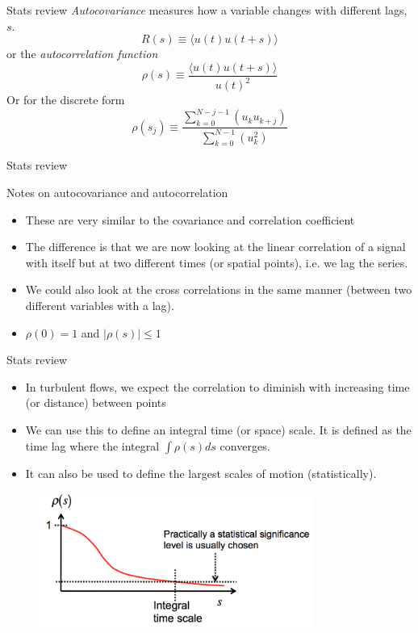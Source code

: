 \begin{frame}{Stats review}
\textit{Autocovariance} measures how a variable changes with different lags, $s$.
  $$R(s) \equiv \langle u(t) u(t+s)\rangle$$
  or the \textit{autocorrelation function}
  $$\rho(s) \equiv \frac{ \langle u(t)u(t+s)\rangle}{u(t)^2}$$
  Or for the discrete form
  $$\rho(s_j) \equiv \frac{ \sum^{N-j-1}_{k=0}(u_ku_{k+j})}{\sum^{N-1}_{k=0}(u_k^2)}$$
\end{frame}


\begin{frame}{Stats review}
  
  Notes on autocovariance and autocorrelation
  \begin{itemize}
  	\item These are very similar to the covariance and correlation coefficient
  	\item The difference is that we are now looking at the linear correlation of a signal with itself but at two different times (or spatial points), i.e. we lag the series.
  	\item We could also look at the cross correlations in the same manner (between two different variables with a lag).
  	\item $\rho(0) = 1$ and $|\rho(s)| \leq 1$
  \end{itemize}
  
\end{frame}


\begin{frame}{Stats review}
    \begin{itemize}
    	\item In turbulent flows, we expect the correlation to diminish with increasing time (or
distance) between points
    	\item We can use this to define an integral time (or space) scale. It is defined as the time lag where the integral $\int \rho(s)ds$ converges. 
    	\item It can also be used to define the largest scales of motion (statistically).
    \end{itemize}
  
  \begin{figure}
  \includegraphics[width=0.8\textwidth]{auto1.png}
  \end{figure}
  
\end{frame}

